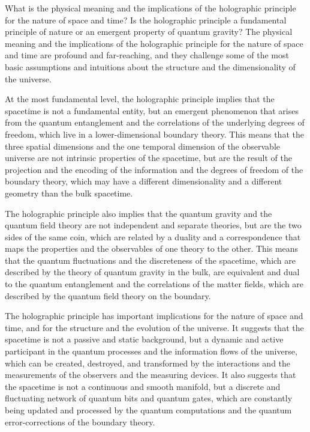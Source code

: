 \begin{tcolorbox}[colback=green!5!white,colframe=green!75!black,title=Question]
    What is the physical meaning and the implications of the holographic principle for the nature of space and time? Is the holographic principle a fundamental principle of nature or an emergent property of quantum gravity?
    \tcblower
    The physical meaning and the implications of the holographic principle for the nature of space and time are profound and far-reaching, and they challenge some of the most basic assumptions and intuitions about the structure and the dimensionality of the universe.

    At the most fundamental level, the holographic principle implies that the spacetime is not a fundamental entity, but an emergent phenomenon that arises from the quantum entanglement and the correlations of the underlying degrees of freedom, which live in a lower-dimensional boundary theory. This means that the three spatial dimensions and the one temporal dimension of the observable universe are not intrinsic properties of the spacetime, but are the result of the projection and the encoding of the information and the degrees of freedom of the boundary theory, which may have a different dimensionality and a different geometry than the bulk spacetime.

    The holographic principle also implies that the quantum gravity and the quantum field theory are not independent and separate theories, but are the two sides of the same coin, which are related by a duality and a correspondence that maps the properties and the observables of one theory to the other. This means that the quantum fluctuations and the discreteness of the spacetime, which are described by the theory of quantum gravity in the bulk, are equivalent and dual to the quantum entanglement and the correlations of the matter fields, which are described by the quantum field theory on the boundary.

    The holographic principle has important implications for the nature of space and time, and for the structure and the evolution of the universe. It suggests that the spacetime is not a passive and static background, but a dynamic and active participant in the quantum processes and the information flows of the universe, which can be created, destroyed, and transformed by the interactions and the measurements of the observers and the measuring devices. It also suggests that the spacetime is not a continuous and smooth manifold, but a discrete and fluctuating network of quantum bits and quantum gates, which are constantly being updated and processed by the quantum computations and the quantum error-corrections of the boundary theory.


\end{tcolorbox}
